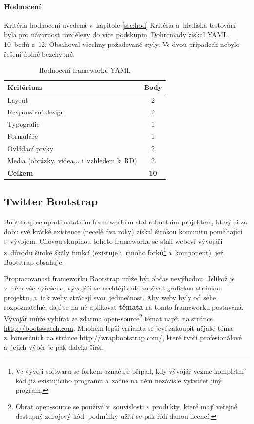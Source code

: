 \documentclass[thesis=B,czech]{FITthesis}[2012/06/26]
\begin{document}
\paragraph{Hodnocení}

Kritéria hodnocení uvedená v~kapitole \ref{sec:hod} Kritéria a~hlediska testování byla pro názornost rozděleny do více podskupin. Dohromady získal \gls{YAML} 10~bodů z~12. Obsahoval všechny požadované styly. Ve dvou případech nebylo řešení úplně bezchybné.

\begin{table}[h]\centering
 	\caption[Hodnocení YAMLu]{Hodnocení frameworku YAML}\label{tab:yaml}
 	\begin{tabular}{|l|c|}\hline
 		\textbf{Kritérium} & \textbf{Body}\tabularnewline
  		\hline \hline
		Layout & 2\tabularnewline
		\hline 
		 Responsivní design & 2\tabularnewline
		\hline 
		Typografie & 1\tabularnewline
		\hline 
		Formuláře & 1\tabularnewline
		\hline 
		Ovládací prvky & 2\tabularnewline
		\hline 
		Media  (obrázky, videa,.. i~vzhledem k~RD) & 2\tabularnewline
		\hline 
		\textbf{Celkem} & \textbf{10}\tabularnewline
		\hline 
 	\end{tabular}
\end{table} 

\subsection{Twitter Bootstrap}
\label{sec:boots}

Bootstrap se oproti ostatním frameworkům stal robustním projektem, který si za dobu své krátké existence (necelé dva roky) získal širokou komunitu pomáhající s~vývojem. Cílovou skupinou tohoto frameworku se stali weboví vývojáři z~důvodu široké škály funkcí (existuje i~mnoho forků\footnote{Ve vývoji softwaru se forkem označuje případ, kdy vývojář vezme kompletní kód již existujícího programu a~začne na něm nezávisle vytvářet jiný program.} a~komponent), jež Bootstrap obsahuje. 

Propracovanost frameworku Bootstrap může být občas nevýhodou. Jelikož je v~něm vše vyřešeno, vývojáři se nechtějí dále zabývat grafickou stránkou projektu, a~tak weby ztrácejí svou jedinečnost.  Aby weby byly od sebe rozpoznatelné, dají se na ně aplikovat \textbf{témata} na tomto frameworku postavená.  Vývojář může vybírat ze zdarma open-source\footnote{Obrat open-source se používá v~souvislosti s~produkty, které mají veřejně dostupný zdrojový kód, podmínky užití se pak řídí danou licencí.} témat např. na stránce \url{http://bootswatch.com}. Mnohem lepší varianta se jeví zakoupit nějaké téma z~komerčních na stránce \url{http://wrapbootstrap.com/}, které tvoří profesionálové a~jejich výběr je pak daleko širší.
\end{document}

